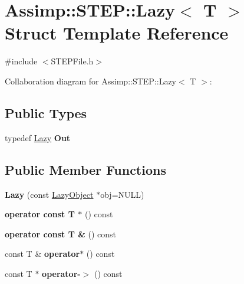 \hypertarget{struct_assimp_1_1_s_t_e_p_1_1_lazy}{\section{Assimp\+:\+:S\+T\+E\+P\+:\+:Lazy$<$ T $>$ Struct Template Reference}
\label{struct_assimp_1_1_s_t_e_p_1_1_lazy}
}


{\ttfamily \#include $<$S\+T\+E\+P\+File.\+h$>$}



Collaboration diagram for Assimp\+:\+:S\+T\+E\+P\+:\+:Lazy$<$ T $>$\+:
\subsection*{Public Types}
\begin{DoxyCompactItemize}
\item 
\hypertarget{struct_assimp_1_1_s_t_e_p_1_1_lazy_a32465aeeb45400428fef46ba334f2737}{typedef \hyperlink{struct_assimp_1_1_s_t_e_p_1_1_lazy}{Lazy} {\bfseries Out}}\label{struct_assimp_1_1_s_t_e_p_1_1_lazy_a32465aeeb45400428fef46ba334f2737}

\end{DoxyCompactItemize}
\subsection*{Public Member Functions}
\begin{DoxyCompactItemize}
\item 
\hypertarget{struct_assimp_1_1_s_t_e_p_1_1_lazy_a600491ccae1e1668bba6a0763978271c}{{\bfseries Lazy} (const \hyperlink{class_assimp_1_1_s_t_e_p_1_1_lazy_object}{Lazy\+Object} $\ast$obj=N\+U\+L\+L)}\label{struct_assimp_1_1_s_t_e_p_1_1_lazy_a600491ccae1e1668bba6a0763978271c}

\item 
\hypertarget{struct_assimp_1_1_s_t_e_p_1_1_lazy_a10dcb9064a12f704131c7b1c8a6179b4}{{\bfseries operator const T $\ast$} () const }\label{struct_assimp_1_1_s_t_e_p_1_1_lazy_a10dcb9064a12f704131c7b1c8a6179b4}

\item 
\hypertarget{struct_assimp_1_1_s_t_e_p_1_1_lazy_ae86660e7253e4edca6fe0ba0b4265207}{{\bfseries operator const T \&} () const }\label{struct_assimp_1_1_s_t_e_p_1_1_lazy_ae86660e7253e4edca6fe0ba0b4265207}

\item 
\hypertarget{struct_assimp_1_1_s_t_e_p_1_1_lazy_a08185bd53d529fe9411681047aac845c}{const T \& {\bfseries operator$\ast$} () const }\label{struct_assimp_1_1_s_t_e_p_1_1_lazy_a08185bd53d529fe9411681047aac845c}

\item 
\hypertarget{struct_assimp_1_1_s_t_e_p_1_1_lazy_aa081e904ea97e97a403a85a9086a62a6}{const T $\ast$ {\bfseries operator-\/$>$} () const }\label{struct_assimp_1_1_s_t_e_p_1_1_lazy_aa081e904ea97e97a403a85a9086a62a6}

\end{DoxyCompactItemize}
